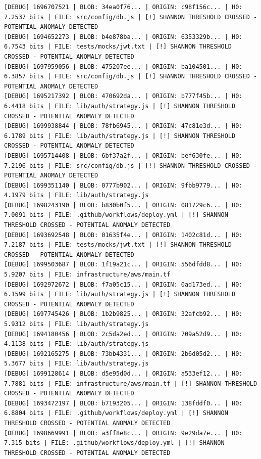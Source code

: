\documentclass[12pt, a4paper, oneside]{report}
\begin{document}
\begin{lstlisting}[basicstyle=\tiny\ttfamily]
[DEBUG] 1696707521 | BLOB: 34ea0f76... | ORIGIN: c98f156c... | H0: 7.2537 bits | FILE: src/config/db.js | [!] SHANNON THRESHOLD CROSSED - POTENTIAL ANOMALY DETECTED
[DEBUG] 1694652273 | BLOB: b4e878ba... | ORIGIN: 6353329b... | H0: 6.7543 bits | FILE: tests/mocks/jwt.txt | [!] SHANNON THRESHOLD CROSSED - POTENTIAL ANOMALY DETECTED
[DEBUG] 1697959056 | BLOB: 475207ee... | ORIGIN: ba104501... | H0: 6.3857 bits | FILE: src/config/db.js | [!] SHANNON THRESHOLD CROSSED - POTENTIAL ANOMALY DETECTED
[DEBUG] 1695217392 | BLOB: 470692da... | ORIGIN: b777f45b... | H0: 6.4418 bits | FILE: lib/auth/strategy.js | [!] SHANNON THRESHOLD CROSSED - POTENTIAL ANOMALY DETECTED
[DEBUG] 1699938844 | BLOB: 78fb6945... | ORIGIN: 47c81e3d... | H0: 6.1789 bits | FILE: lib/auth/strategy.js | [!] SHANNON THRESHOLD CROSSED - POTENTIAL ANOMALY DETECTED
[DEBUG] 1695714408 | BLOB: 6bf37a2f... | ORIGIN: bef630fe... | H0: 7.2196 bits | FILE: src/config/db.js | [!] SHANNON THRESHOLD CROSSED - POTENTIAL ANOMALY DETECTED
[DEBUG] 1699351140 | BLOB: 0777b902... | ORIGIN: 9fbb9779... | H0: 4.1979 bits | FILE: lib/auth/strategy.js
[DEBUG] 1698243190 | BLOB: b830b0f5... | ORIGIN: 081729c6... | H0: 7.0091 bits | FILE: .github/workflows/deploy.yml | [!] SHANNON THRESHOLD CROSSED - POTENTIAL ANOMALY DETECTED
[DEBUG] 1693692548 | BLOB: 01635f4e... | ORIGIN: 1402c81d... | H0: 7.2187 bits | FILE: tests/mocks/jwt.txt | [!] SHANNON THRESHOLD CROSSED - POTENTIAL ANOMALY DETECTED
[DEBUG] 1699503687 | BLOB: 1f19a21c... | ORIGIN: 556dfdd8... | H0: 5.9207 bits | FILE: infrastructure/aws/main.tf
[DEBUG] 1692972672 | BLOB: f7a05c15... | ORIGIN: 0ad173ed... | H0: 6.1599 bits | FILE: lib/auth/strategy.js | [!] SHANNON THRESHOLD CROSSED - POTENTIAL ANOMALY DETECTED
[DEBUG] 1697745426 | BLOB: 1b2b9825... | ORIGIN: 32afcb92... | H0: 5.9312 bits | FILE: lib/auth/strategy.js
[DEBUG] 1694180456 | BLOB: 2c5da2ed... | ORIGIN: 709a52d9... | H0: 4.1138 bits | FILE: lib/auth/strategy.js
[DEBUG] 1692165275 | BLOB: 73bb4331... | ORIGIN: 2b6d05d2... | H0: 5.3677 bits | FILE: lib/auth/strategy.js
[DEBUG] 1699128614 | BLOB: d5e95d0d... | ORIGIN: a533ef12... | H0: 7.7881 bits | FILE: infrastructure/aws/main.tf | [!] SHANNON THRESHOLD CROSSED - POTENTIAL ANOMALY DETECTED
[DEBUG] 1693472197 | BLOB: b7193205... | ORIGIN: 138fddf0... | H0: 6.8804 bits | FILE: .github/workflows/deploy.yml | [!] SHANNON THRESHOLD CROSSED - POTENTIAL ANOMALY DETECTED
[DEBUG] 1698669991 | BLOB: a3ff8e8c... | ORIGIN: 9e29da7e... | H0: 7.315 bits | FILE: .github/workflows/deploy.yml | [!] SHANNON THRESHOLD CROSSED - POTENTIAL ANOMALY DETECTED

\end{lstlisting}
\end{document}
